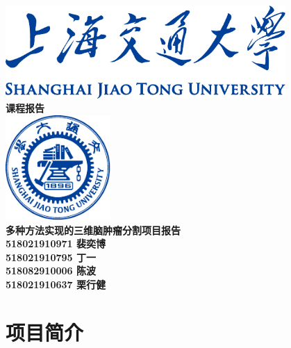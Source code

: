 \documentclass[UTF8]{ctexart}
\begin{document}
\begin{titlepage}
    \begin{center}
        \includegraphics[width=0.8\textwidth]{sjtu-name-blue.pdf}\\[1cm]
        \textsc{\Huge \bfseries 课程报告}\\[1.5cm]
        \includegraphics[width=0.3\textwidth]{sjtu-badge-blue.pdf}\\[0.5cm]    

        \Huge \bfseries{多种方法实现的三维脑肿瘤分割项目报告}\\[1cm]
        \Large \bfseries{518021910971 裴奕博}\\
        \Large \bfseries{518021910795 丁一}\\
        \Large \bfseries{518082910006 陈波}\\
        \Large \bfseries{518021910637 栗行健}
    \end{center}
\end{titlepage}
\tableofcontents

\newpage
\section{项目简介}
\end{document}
